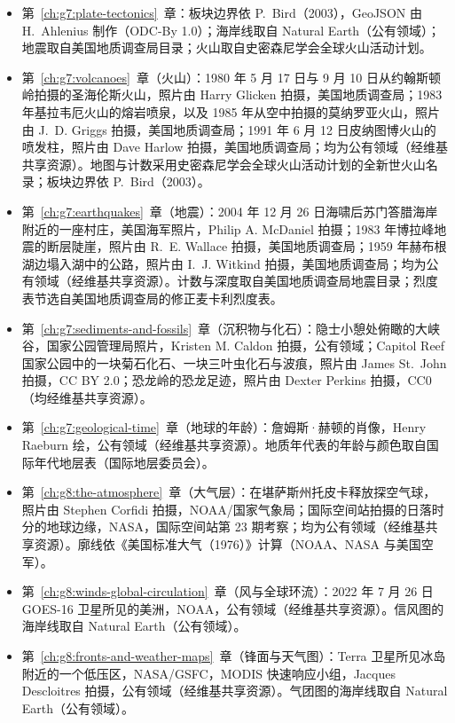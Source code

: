 \begin{itemize}
  \item 第~\ref{ch:g7:plate-tectonics}~章：板块边界依 P.~Bird（2003），GeoJSON 由 H.~Ahlenius 制作（ODC-By 1.0）；海岸线取自 Natural Earth（公有领域）；地震取自美国地质调查局目录；火山取自史密森尼学会全球火山活动计划。
  \item 第~\ref{ch:g7:volcanoes}~章（火山）：1980 年 5 月 17 日与 9 月 10 日从约翰斯顿岭拍摄的圣海伦斯火山，照片由 Harry Glicken 拍摄，美国地质调查局；1983 年基拉韦厄火山的熔岩喷泉，以及 1985 年从空中拍摄的莫纳罗亚火山，照片由 J.~D. Griggs 拍摄，美国地质调查局；1991 年 6 月 12 日皮纳图博火山的喷发柱，照片由 Dave Harlow 拍摄，美国地质调查局；均为公有领域（经维基共享资源）。地图与计数采用史密森尼学会全球火山活动计划的全新世火山名录；板块边界依 P.~Bird（2003）。
  \item 第~\ref{ch:g7:earthquakes}~章（地震）：2004 年 12 月 26 日海啸后苏门答腊海岸附近的一座村庄，美国海军照片，Philip A. McDaniel 拍摄；1983 年博拉峰地震的断层陡崖，照片由 R.~E. Wallace 拍摄，美国地质调查局；1959 年赫布根湖边塌入湖中的公路，照片由 I.~J. Witkind 拍摄，美国地质调查局；均为公有领域（经维基共享资源）。计数与深度取自美国地质调查局地震目录；烈度表节选自美国地质调查局的修正麦卡利烈度表。
  \item 第~\ref{ch:g7:sediments-and-fossils}~章（沉积物与化石）：隐士小憩处俯瞰的大峡谷，国家公园管理局照片，Kristen M. Caldon 拍摄，公有领域；Capitol Reef 国家公园中的一块菊石化石、一块三叶虫化石与波痕，照片由 James St.~John 拍摄，CC BY 2.0；恐龙岭的恐龙足迹，照片由 Dexter Perkins 拍摄，CC0（均经维基共享资源）。
  \item 第~\ref{ch:g7:geological-time}~章（地球的年龄）：詹姆斯·赫顿的肖像，Henry Raeburn 绘，公有领域（经维基共享资源）。地质年代表的年龄与颜色取自国际年代地层表（国际地层委员会）。
  \item 第~\ref{ch:g8:the-atmosphere}~章（大气层）：在堪萨斯州托皮卡释放探空气球，照片由 Stephen Corfidi 拍摄，NOAA/国家气象局；国际空间站拍摄的日落时分的地球边缘，NASA，国际空间站第 23 期考察；均为公有领域（经维基共享资源）。廓线依《美国标准大气（1976）》计算（NOAA、NASA 与美国空军）。
  \item 第~\ref{ch:g8:winds-global-circulation}~章（风与全球环流）：2022 年 7 月 26 日 GOES-16 卫星所见的美洲，NOAA，公有领域（经维基共享资源）。信风图的海岸线取自 Natural Earth（公有领域）。
  \item 第~\ref{ch:g8:fronts-and-weather-maps}~章（锋面与天气图）：Terra 卫星所见冰岛附近的一个低压区，NASA/GSFC，MODIS 快速响应小组，Jacques Descloitres 拍摄，公有领域（经维基共享资源）。气团图的海岸线取自 Natural Earth（公有领域）。

\end{itemize}
